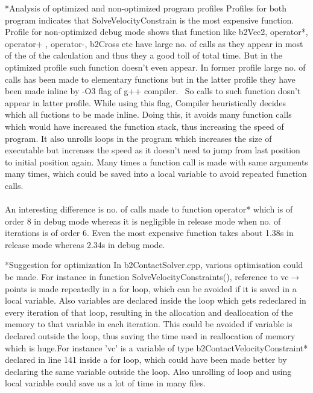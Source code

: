 \documentclass[11pt]{article}
\begin{document}
\begin{section}
\begin{subsection}*{Analysis of optimized and non-optimized program profiles}
 Profiles for both program indicates that SolveVelocityConstrain is the most expensive function. Profile for non-optimized debug mode shows that function like b2Vec2, operator*, operator+ , operator-, b2Cross etc have large no. of calls as they appear in most of the of the calculation and thus they a good toll of total time. But in the optimized profile such function doesn't even appear. In former profile large no. of calls has been made to elementary functions but in the latter profile they have been made inline by -O3 flag of g++ compiler.~\cite{GNU} So calls to such function dosn't appear in latter profile. While using this flag, Compiler heuristically decides which all fuctions to be made inline. Doing this, it avoids many function calls which would have increased the function stack, thus increasing the speed of program. It also unrolls loops in the program which increases the size of executable but increases the speed as it doesn't need to jump from last position to initial position again. Many times a function call is made with same arguments many times, which could be saved into a local variable to avoid repeated function calls.
\\\\
An interesting difference is no. of calls made to function operator* which is of order 8 in debug mode whereas it is negligible in release mode when no. of iterations is of order 6. Even the most expensive function takes about 1.38s in release mode whereas 2.34s in debug mode.  
\end{subsection}

\begin{subsection}*{Suggestion for optimization}
 In b2ContactSolver.cpp, various optimisation could be made. For instance in function SolveVelocityConstraints(), reference to vc$\rightarrow$points is made repeatedly in a for loop, which can be avoided if it is saved in a local variable. Also variables are declared inside the loop which gets redeclared in every iteration of that loop, resulting in the allocation and deallocation of the memory to that variable in each iteration. This could be avoided if variable is declared outside the loop, thus saving the time used in reallocation of memory which is huge.For instance 'vc' is a variable of type b2ContactVelocityConstraint* declared in line 141 inside a for loop, which could have been made better by declaring the same variable outside the loop.  Also unrolling of loop and using local variable could save us a lot of time in many files.
\end{subsection}


\end{section}
\end{document}
